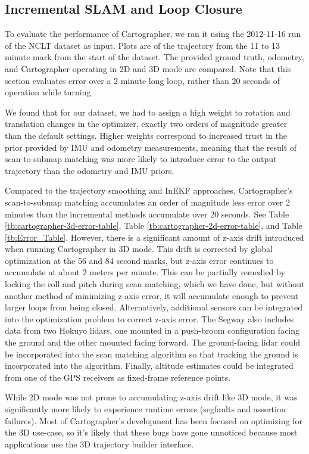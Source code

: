 \subsection{Incremental SLAM and Loop Closure}

To evaluate the performance of Cartographer, we ran it using the 2012-11-16 run of the NCLT dataset as input. Plots are of the trajectory from the 11 to 13 minute mark from the start of the dataset. The provided ground truth, odometry, and Cartographer operating in 2D and 3D mode are compared. Note that this section evaluates error over a 2 minute long loop, rather than 20 seconds of operation while turning.

We found that for our dataset, we had to assign a high weight to rotation and translation changes in the optimizer, exactly two orders of magnitude greater than the default settings. Higher weights correspond to increased trust in the prior provided by IMU and odometry measurements, meaning that the result of scan-to-submap matching was more likely to introduce error to the output trajectory than the odometry and IMU priors.

Compared to the trajectory smoothing and InEKF approaches, Cartographer's scan-to-submap matching accumulates an order of magnitude less error over 2 minutes than the incremental methods accumulate over 20 seconds. See Table \ref{tb:cartographer-3d-error-table}, Table \ref{tb:cartographer-2d-error-table}, and Table \ref{tb:Error_Table}. However, there is a significant amount of z-axis drift introduced when running Cartographer in 3D mode. This drift is corrected by global optimization at the 56 and 84 second marks, but z-axis error continues to accumulate at about 2 meters per minute. This can be partially remedied by locking the roll and pitch during scan matching, which we have done, but without another method of minimizing z-axis error, it will accumulate enough to prevent larger loops from being closed. Alternatively, additional sensors can be integrated into the optimization problem to correct z-axis error. The Segway also includes data from two Hokuyo lidars, one mounted in a push-broom configuration facing the ground and the other mounted facing forward. The ground-facing lidar could be incorporated into the scan matching algorithm so that tracking the ground is incorporated into the algorithm. Finally, altitude estimates could be integrated from one of the GPS receivers as fixed-frame reference points.

While 2D mode was not prone to accumulating z-axis drift like 3D mode, it was significantly more likely to experience runtime errors (segfaults and assertion failures). Most of Cartographer's development has been focused on optimizing for the 3D use-case, so it's likely that these bugs have gone unnoticed because most applications use the 3D trajectory builder interface.

